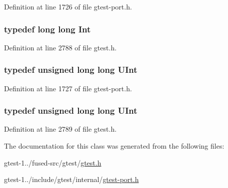 \-Definition at line 1726 of file gtest-\/port.\-h.

\hypertarget{classtesting_1_1internal_1_1TypeWithSize_3_018_01_4_a1117baba620e5dd9dc3293724e10a15f}{
\subsubsection[{\-Int}]{\setlength{\rightskip}{0pt plus 5cm}typedef long long {\bf \-Int}}}\label{d8/da4/classtesting_1_1internal_1_1TypeWithSize_3_018_01_4_a1117baba620e5dd9dc3293724e10a15f}


\-Definition at line 2788 of file gtest.\-h.

\hypertarget{classtesting_1_1internal_1_1TypeWithSize_3_018_01_4_a09f1489f5176f7ccd5484718e1449838}{
\subsubsection[{\-U\-Int}]{\setlength{\rightskip}{0pt plus 5cm}typedef unsigned long long {\bf \-U\-Int}}}\label{d8/da4/classtesting_1_1internal_1_1TypeWithSize_3_018_01_4_a09f1489f5176f7ccd5484718e1449838}


\-Definition at line 1727 of file gtest-\/port.\-h.

\hypertarget{classtesting_1_1internal_1_1TypeWithSize_3_018_01_4_a09f1489f5176f7ccd5484718e1449838}{
\subsubsection[{\-U\-Int}]{\setlength{\rightskip}{0pt plus 5cm}typedef unsigned long long {\bf \-U\-Int}}}\label{d8/da4/classtesting_1_1internal_1_1TypeWithSize_3_018_01_4_a09f1489f5176f7ccd5484718e1449838}


\-Definition at line 2789 of file gtest.\-h.



\-The documentation for this class was generated from the following files\-:\begin{DoxyCompactItemize}
\item 
gtest-\/1../fused-\/src/gtest/\hyperlink{fused-src_2gtest_2gtest_8h}{gtest.\-h}\item 
gtest-\/1../include/gtest/internal/\hyperlink{gtest-port_8h}{gtest-\/port.\-h}\end{DoxyCompactItemize}
